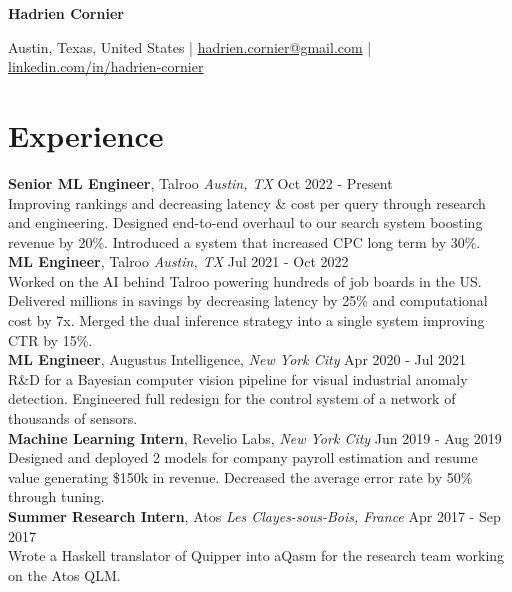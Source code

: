\documentclass[a4paper,10pt]{article}
\begin{document}
    \pagestyle{empty}

    \centerline{\huge \textbf{Hadrien Cornier}}
    \vspace{2mm}
    \centerline{Austin, Texas, United States | \href{mailto:hadrien.cornier@gmail.com}{hadrien.cornier@gmail.com} | \href{https://linkedin.com/in/hadrien-cornier}{linkedin.com/in/hadrien-cornier}}

    \section*{Experience}
    \noindent\textbf{Senior ML Engineer}, Talroo  \textit{Austin, TX} \hfill Oct 2022 - Present\\
    Improving rankings and decreasing latency \& cost per query through research and engineering. Designed end-to-end overhaul to our search system boosting revenue by 20\%. Introduced a system that increased CPC long term by 30\%.\\

    \noindent\textbf{ML Engineer}, Talroo \textit{Austin, TX} \hfill Jul 2021 - Oct 2022\\
    Worked on the AI behind Talroo powering hundreds of job boards in the US. Delivered millions in savings by decreasing latency by 25\% and computational cost by 7x. Merged the dual inference strategy into a single system improving CTR by 15\%.\\

    \noindent\textbf{ML Engineer}, Augustus Intelligence, \textit{New York City} \hfill Apr 2020 - Jul 2021\\
    R\&D for a Bayesian computer vision pipeline for visual industrial anomaly detection. Engineered full redesign for the control system of a network of thousands of sensors.\\

    \noindent\textbf{Machine Learning Intern}, Revelio Labs, \textit{New York City} \hfill Jun 2019 - Aug 2019\\
    Designed and deployed 2 models for company payroll estimation and resume value generating \$150k in revenue. Decreased the average error rate by 50\% through tuning.\\

    \noindent\textbf{Summer Research Intern}, Atos \textit{Les Clayes-sous-Bois, France} \hfill Apr 2017 - Sep 2017\\
    Wrote a Haskell translator of Quipper into aQasm for the research team working on the Atos QLM.\\
\end{document}

